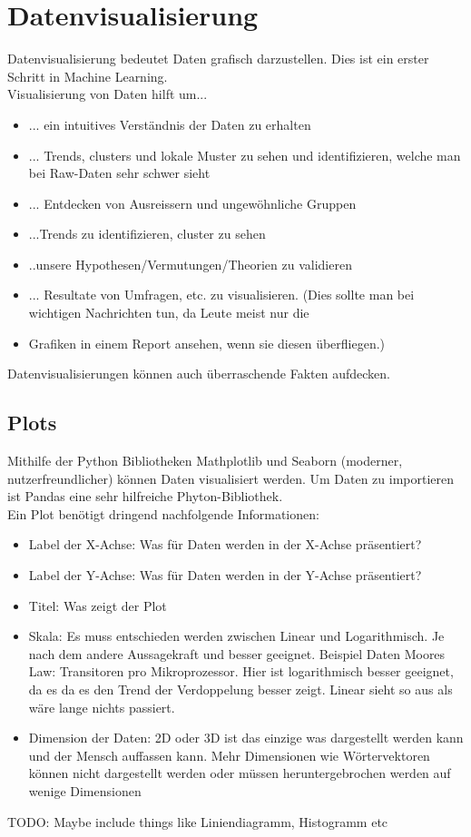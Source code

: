 \section{Datenvisualisierung}
Datenvisualisierung bedeutet Daten grafisch darzustellen. Dies ist ein erster Schritt in Machine Learning.\\
Visualisierung von Daten hilft um...
\begin{itemize}
\item ... ein intuitives Verständnis der Daten zu erhalten
\item ... Trends, clusters und lokale Muster zu sehen und identifizieren, welche man bei Raw-Daten sehr schwer sieht
\item ... Entdecken von Ausreissern und ungewöhnliche Gruppen
\item ...Trends zu identifizieren, cluster zu sehen
\item ..unsere Hypothesen/Vermutungen/Theorien zu validieren
\item ... Resultate von Umfragen, etc. zu visualisieren. (Dies sollte man bei wichtigen Nachrichten tun, da Leute meist nur die
\item Grafiken in einem Report ansehen, wenn sie diesen überfliegen.)
\end{itemize}
Datenvisualisierungen können auch überraschende Fakten aufdecken.
\subsection{Plots}
Mithilfe der Python Bibliotheken Mathplotlib und Seaborn (moderner, nutzerfreundlicher) können Daten visualisiert werden.
Um Daten zu importieren ist Pandas eine sehr hilfreiche Phyton-Bibliothek.\\
Ein Plot benötigt dringend nachfolgende Informationen:
\begin{itemize}
\item Label der X-Achse: Was für Daten werden in der X-Achse präsentiert?
\item Label der Y-Achse: Was für Daten werden in der Y-Achse präsentiert?
\item Titel: Was zeigt der Plot
\item Skala: Es muss entschieden werden zwischen Linear und Logarithmisch. Je nach dem andere Aussagekraft und besser geeignet. Beispiel Daten Moores Law: Transitoren pro Mikroprozessor. Hier ist logarithmisch besser geeignet, da es da es den Trend der Verdoppelung besser zeigt. Linear sieht so aus als wäre lange nichts passiert.
\item Dimension der Daten: 2D oder 3D ist das einzige was dargestellt werden kann und der Mensch auffassen kann. Mehr Dimensionen wie Wörtervektoren können nicht dargestellt werden oder müssen heruntergebrochen werden auf wenige Dimensionen
\end{itemize}
TODO: Maybe include things like Liniendiagramm, Histogramm etc


